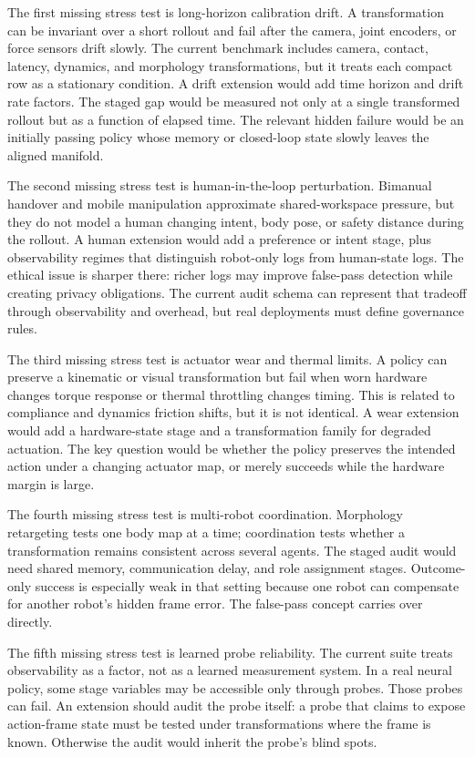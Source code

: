 \documentclass{article}
\begin{document}
The first missing stress test is long-horizon calibration drift. A transformation can be invariant over a short rollout and fail after the camera, joint encoders, or force sensors drift slowly. The current benchmark includes camera, contact, latency, dynamics, and morphology transformations, but it treats each compact row as a stationary condition. A drift extension would add time horizon and drift rate factors. The staged gap would be measured not only at a single transformed rollout but as a function of elapsed time. The relevant hidden failure would be an initially passing policy whose memory or closed-loop state slowly leaves the aligned manifold.

The second missing stress test is human-in-the-loop perturbation. Bimanual handover and mobile manipulation approximate shared-workspace pressure, but they do not model a human changing intent, body pose, or safety distance during the rollout. A human extension would add a preference or intent stage, plus observability regimes that distinguish robot-only logs from human-state logs. The ethical issue is sharper there: richer logs may improve false-pass detection while creating privacy obligations. The current audit schema can represent that tradeoff through observability and overhead, but real deployments must define governance rules.

The third missing stress test is actuator wear and thermal limits. A policy can preserve a kinematic or visual transformation but fail when worn hardware changes torque response or thermal throttling changes timing. This is related to compliance and dynamics friction shifts, but it is not identical. A wear extension would add a hardware-state stage and a transformation family for degraded actuation. The key question would be whether the policy preserves the intended action under a changing actuator map, or merely succeeds while the hardware margin is large.

The fourth missing stress test is multi-robot coordination. Morphology retargeting tests one body map at a time; coordination tests whether a transformation remains consistent across several agents. The staged audit would need shared memory, communication delay, and role assignment stages. Outcome-only success is especially weak in that setting because one robot can compensate for another robot's hidden frame error. The false-pass concept carries over directly.

The fifth missing stress test is learned probe reliability. The current suite treats observability as a factor, not as a learned measurement system. In a real neural policy, some stage variables may be accessible only through probes. Those probes can fail. An extension should audit the probe itself: a probe that claims to expose action-frame state must be tested under transformations where the frame is known. Otherwise the audit would inherit the probe's blind spots.
\end{document}
